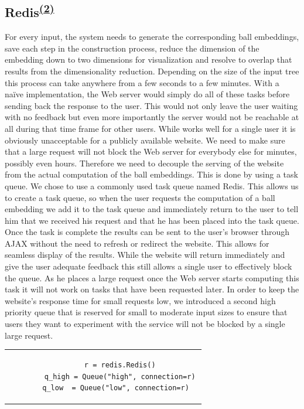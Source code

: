 \subsection[Redis]{Redis\textsuperscript{\hyperref[Oliver]{(2)}}}
\label{sec::redis}
For every input, the system needs to generate the corresponding ball embeddings, save each step in the construction process, reduce the dimension of the embedding down to two dimensions for visualization and resolve to overlap that results from the dimensionality reduction. Depending on the size of the input tree this process can take anywhere from a few seconds to a few minutes. With a naïve implementation, the Web server would simply do all of these tasks before sending back the response to the user. This would not only leave the user waiting with no feedback but even more importantly the server would not be reachable at all during that time frame for other users. While works well for a single user it is obviously unacceptable for a publicly available website. We need to make sure that a large request will not block the Web server for everybody else for minutes, possibly even hours. Therefore we need to decouple the serving of the website from the actual computation of the ball embeddings. This is done by using a task queue.
We chose to use a commonly used task queue named Redis. This allows us to create a task queue, so when the user requests the computation of a ball embedding we add it to the task queue and immediately return to the user to tell him that we received his request and that he has been placed into the task queue. Once the task is complete the results can be sent to the user's browser through AJAX without the need to refresh or redirect the website. This allows for seamless display of the results. While the website will return immediately and give the user adequate feedback this still allows a single user to effectively block the queue. As he places a large request once the Web server starts computing this task it will not work on tasks that have been requested later. In order to keep the website's response time for small requests low, we introduced a second high priority queue that is reserved for small to moderate input sizes to ensure that users they want to experiment with the service will not be blocked by a single large request.
\begin{center}
	
	
	\begin{tabular}{c}
		\begin{lstlisting}
		r = redis.Redis()
		q_high = Queue("high", connection=r)
		q_low  = Queue("low", connection=r)  
		\end{lstlisting}
	\end{tabular}
\end{center}


